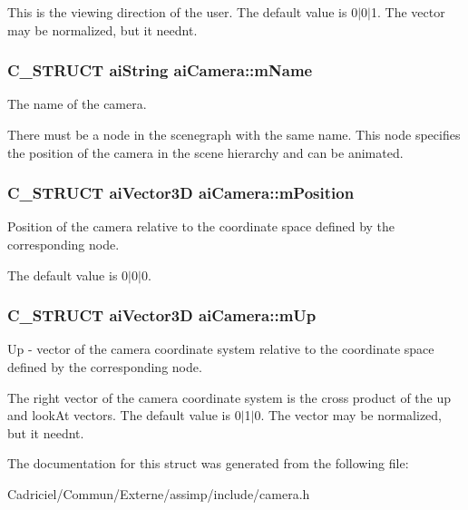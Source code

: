 This is the viewing direction of the user. The default value is 0$\vert$0$\vert$1. The vector may be normalized, but it needn\textquotesingle{}t. 
\subsubsection[{\texorpdfstring{m\+Name}{mName}}]{\setlength{\rightskip}{0pt plus 5cm}C\+\_\+\+S\+T\+R\+U\+CT {\bf ai\+String} ai\+Camera\+::m\+Name}\hypertarget{structai_camera_aa6a5fe5e04b3db1b23f69eb9910c6816}{}\label{structai_camera_aa6a5fe5e04b3db1b23f69eb9910c6816}
The name of the camera.

There must be a node in the scenegraph with the same name. This node specifies the position of the camera in the scene hierarchy and can be animated. 
\subsubsection[{\texorpdfstring{m\+Position}{mPosition}}]{\setlength{\rightskip}{0pt plus 5cm}C\+\_\+\+S\+T\+R\+U\+CT {\bf ai\+Vector3D} ai\+Camera\+::m\+Position}\hypertarget{structai_camera_a518617ea192ca0698e748a4399e7c3a5}{}\label{structai_camera_a518617ea192ca0698e748a4399e7c3a5}
Position of the camera relative to the coordinate space defined by the corresponding node.

The default value is 0$\vert$0$\vert$0. 
\subsubsection[{\texorpdfstring{m\+Up}{mUp}}]{\setlength{\rightskip}{0pt plus 5cm}C\+\_\+\+S\+T\+R\+U\+CT {\bf ai\+Vector3D} ai\+Camera\+::m\+Up}\hypertarget{structai_camera_a7fb42b287389b4f99c883098268d6d1a}{}\label{structai_camera_a7fb42b287389b4f99c883098268d6d1a}
\textquotesingle{}Up\textquotesingle{} -\/ vector of the camera coordinate system relative to the coordinate space defined by the corresponding node.

The \textquotesingle{}right\textquotesingle{} vector of the camera coordinate system is the cross product of the up and look\+At vectors. The default value is 0$\vert$1$\vert$0. The vector may be normalized, but it needn\textquotesingle{}t. 

The documentation for this struct was generated from the following file\+:\begin{DoxyCompactItemize}
\item 
Cadriciel/\+Commun/\+Externe/assimp/include/camera.\+h\end{DoxyCompactItemize}
